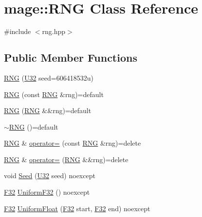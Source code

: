 \hypertarget{classmage_1_1_r_n_g}{}\section{mage\+:\+:R\+NG Class Reference}
\label{classmage_1_1_r_n_g}


{\ttfamily \#include $<$rng.\+hpp$>$}

\subsection*{Public Member Functions}
\begin{DoxyCompactItemize}
\item 
\hyperlink{classmage_1_1_r_n_g_a381a917dce1f2d319859b700a4410ffc}{R\+NG} (\hyperlink{namespacemage_a41c104c036fba3756a74e19f793eeaa1}{U32} seed=606418532u)
\item 
\hyperlink{classmage_1_1_r_n_g_ae85dd3ab6679a308610880779d65955a}{R\+NG} (const \hyperlink{classmage_1_1_r_n_g}{R\+NG} \&rng)=default
\item 
\hyperlink{classmage_1_1_r_n_g_aea109c4ab1644a5294d7c2c1031a50c9}{R\+NG} (\hyperlink{classmage_1_1_r_n_g}{R\+NG} \&\&rng)=default
\item 
\hyperlink{classmage_1_1_r_n_g_a20d24aabf31837e48a38b9ca221b0a9b}{$\sim$\+R\+NG} ()=default
\item 
\hyperlink{classmage_1_1_r_n_g}{R\+NG} \& \hyperlink{classmage_1_1_r_n_g_a38a0a4296338162fe105012cb4d13318}{operator=} (const \hyperlink{classmage_1_1_r_n_g}{R\+NG} \&rng)=delete
\item 
\hyperlink{classmage_1_1_r_n_g}{R\+NG} \& \hyperlink{classmage_1_1_r_n_g_ac9155db13a3d4b7f44a4f800085197a2}{operator=} (\hyperlink{classmage_1_1_r_n_g}{R\+NG} \&\&rng)=delete
\item 
void \hyperlink{classmage_1_1_r_n_g_a1d7bc2fd5525a252d4900f5dd4754162}{Seed} (\hyperlink{namespacemage_a41c104c036fba3756a74e19f793eeaa1}{U32} seed) noexcept
\item 
\hyperlink{namespacemage_aa97e833b45f06d60a0a9c4fc22ae02c0}{F32} \hyperlink{classmage_1_1_r_n_g_a94e3e2dc84e277c3dba004da386941f9}{Uniform\+F32} () noexcept
\item 
\hyperlink{namespacemage_aa97e833b45f06d60a0a9c4fc22ae02c0}{F32} \hyperlink{classmage_1_1_r_n_g_a43acf77450062519dedd3e492614317d}{Uniform\+Float} (\hyperlink{namespacemage_aa97e833b45f06d60a0a9c4fc22ae02c0}{F32} start, \hyperlink{namespacemage_aa97e833b45f06d60a0a9c4fc22ae02c0}{F32} end) noexcept
\end{DoxyCompactItemize}

